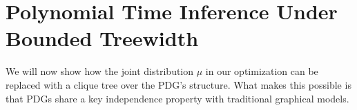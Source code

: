 \documentclass{article}
\begin{document}
\section{Polynomial Time Inference Under Bounded Treewidth}
    \label{sec:clique-tree-expcone}

We will now show how the joint distribution $\mu$ in our optimization can be replaced
with a clique tree over the PDG's structure. What makes this possible is that
PDGs share a key independence property with traditional graphical models.
\end{document}
